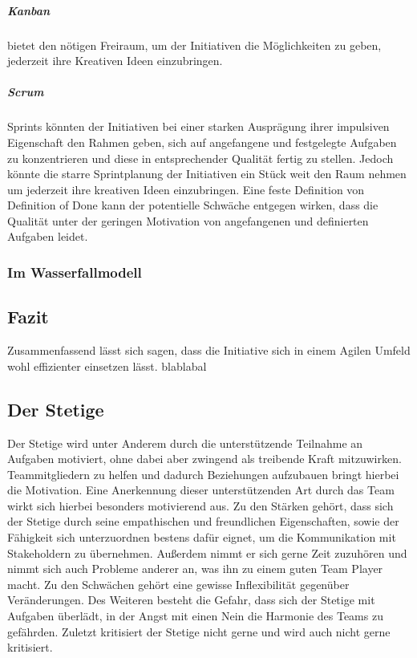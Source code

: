 \documentclass[twocolumn,10pt]{asme2ej}
\begin{document}
\subparagraph{Kanban} bietet den nötigen Freiraum, um der Initiativen die Möglichkeiten zu geben, jederzeit ihre Kreativen Ideen einzubringen. 

\subparagraph{Scrum} Sprints könnten der Initiativen bei einer starken Ausprägung ihrer impulsiven Eigenschaft den Rahmen geben, sich auf angefangene und festgelegte Aufgaben zu konzentrieren und diese in entsprechender Qualität fertig zu stellen. Jedoch könnte die starre Sprintplanung der Initiativen ein Stück weit den Raum nehmen um jederzeit ihre kreativen Ideen einzubringen. Eine feste Definition von Definition of Done kann der potentielle Schwäche entgegen wirken, dass die Qualität unter der geringen Motivation von angefangenen und definierten Aufgaben leidet.

\subsubsection{Im Wasserfallmodell}


\subsection{Fazit}
Zusammenfassend lässt sich sagen, dass die Initiative sich in einem Agilen Umfeld wohl effizienter einsetzen lässt. blablabal


\subsection{Der Stetige}
Der Stetige wird unter Anderem durch die unterstützende Teilnahme an Aufgaben motiviert, ohne dabei aber zwingend als treibende Kraft mitzuwirken. Teammitgliedern zu helfen und dadurch Beziehungen aufzubauen bringt hierbei die Motivation. Eine Anerkennung dieser unterstützenden Art durch das Team wirkt sich hierbei besonders motivierend aus. Zu den Stärken gehört, dass sich der Stetige durch seine empathischen und freundlichen Eigenschaften, sowie der Fähigkeit sich unterzuordnen bestens dafür eignet, um die Kommunikation mit Stakeholdern zu übernehmen. Außerdem nimmt er sich gerne Zeit zuzuhören und nimmt sich auch Probleme anderer an, was ihn zu einem guten Team Player macht. Zu den Schwächen gehört eine gewisse Inflexibilität gegenüber Veränderungen. Des Weiteren besteht die Gefahr, dass sich der Stetige mit Aufgaben überlädt, in der Angst mit einen Nein die Harmonie des Teams zu gefährden. Zuletzt kritisiert der Stetige nicht gerne und wird auch nicht gerne kritisiert.
\end{document}
